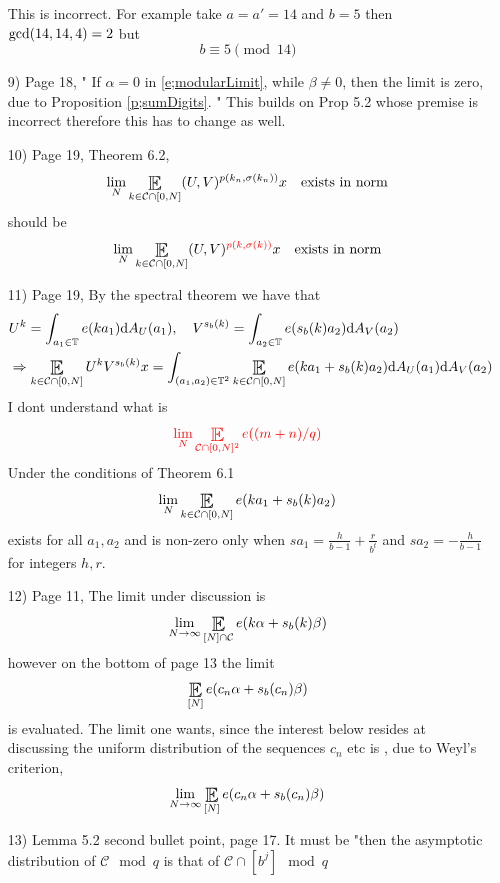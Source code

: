 \documentclass[12pt,leqno]{amsart}
\def\d{{\rm d}}
\newcounter{counter}
\newcounter{counter2}
\numberwithin{equation}{section}
\numberwithin{counter2}{section}
\newcounter{theorem}
\theoremstyle{definition}
\theoremstyle{plain}
\DeclareMathOperator*{\Expectation}{\scalerel*{\mathbb{E}}{\textstyle\sum}}
\begin{document}
\begin{itemize}
		This is incorrect. For example take $a=a'=14$ and $b=5$ then $\textup{gcd}(14,14,4)=2$ but \[ b \equiv 5 \pmod{ 14} \]
		\item[9)] Page 18, " If $\alpha=0$ in \eqref{e;modularLimit}, while $\beta\neq0$, then the limit is zero, due to Proposition \ref{p;sumDigits}. " This builds on Prop 5.2 whose premise is incorrect therefore this has to change as well. 
		\item[10)] Page 19, Theorem 6.2, \begin{equation}
			\lim_N  \Expectation_{k\in \mathcal C \cap [0,N]}(U,V) ^{p (k_n, \sigma(k_n))}  x  
			\quad \textup{exists in norm} 
		\end{equation} should be   \begin{equation}
		\lim_N  \Expectation_{k\in \mathcal C \cap [0,N]}(U,V) ^{{\color{red}p (k, \sigma(k))}}  x  
		\quad \textup{exists in norm} 
		\end{equation}
		\item[11)] Page 19, By the spectral theorem we have that \[ \begin{split}
		&	U^k= \int_{a_1 \in \mathbb{T}}e(ka_1) \d A_{U}(a_1), \quad V^{s_b(k)}= \int_{a_2 \in \mathbb{T}} e(s_b(k)a_2) \d A_V(a_2) \\ & \Rightarrow \Expectation_{k \in \mathcal{C} \cap [0,N]} U^k V^{s_b(k)}x = \int_{(a_1,a_2) \in \mathbb{T}^2} \Expectation_{k \in \mathcal{C} \cap [0,N]  } e(ka_1+s_b(k)a_2) \d A_{U}(a_1)  \d A_V(a_2)
		\end{split} \]
		I dont understand what is \[ {\color{red}
				\lim_N  \Expectation_{\mathcal C \cap [0,N] ^2 } e((m +n)/q)}  
	\]
			Under the conditions of Theorem 6.1 \[ \lim_{N} \Expectation_{k \in \mathcal{C} \cap [0,N]  } e(ka_1+s_b(k)a_2)  \] exists for all $a_1,a_2$ and is non-zero only when $sa_1=\frac{h}{b-1}+\frac{r}{b^t}$ and $sa_2=-\frac{h}{b-1}$ for integers $h,r$.
            \item[12)] Page 11, The limit under discussion is \[ \lim_{N \to \infty} \Expectation_{[N] \cap \mathcal{C}}e(k \alpha+s_b(k)\beta)  \] however on the bottom of page 13 the limit \[ \Expectation_{[N]}e(c_n \alpha+s_b(c_n) \beta) \] is evaluated. The limit one wants, since  the interest below resides at discussing the uniform distribution of the sequences $c_n$ etc is , due to Weyl's criterion, \[ \lim_{N \to \infty} \Expectation_{[N]}e(c_n \alpha+s_b(c_n)\beta) \]
            \item[13)] Lemma 5.2 second bullet point, page 17. It must be "then the asymptotic distribution of $\mathcal{C} \mod q   $ is that of $\mathcal{C} \cap [b^j] \mod q$
	\end{itemize}
\end{document}
